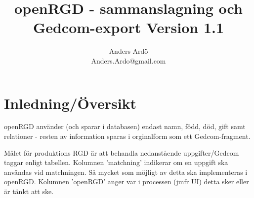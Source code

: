 \documentclass[swedish,11pt]{article}
\title{openRGD - sammanslagning och Gedcom-export \newline
  Version 1.1}
\author{Anders Ardö\\Anders.Ardo@gmail.com}
\begin{document}
\maketitle

\section{Inledning/Översikt}
openRGD använder (och sparar i databasen) endast namn, född, död, gift samt relationer
- resten av information sparas i orginalform som ett Gedcom-fragment.

Målet för produktions RGD är att behandla nedanstående uppgifter/Gedcom taggar enligt tabellen.
Kolumnen 'matchning' indikerar om en uppgift ska användas vid matchningen.
Så mycket som möjligt av detta ska implementeras i openRGD.
Kolumnen 'openRGD' anger
var i processen (jmfr UI) detta sker eller är tänkt att ske.

\end{document}
